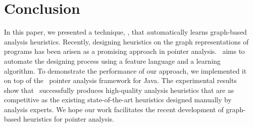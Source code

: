 
\section{Conclusion}
In this paper, we presented a technique, \OurCtx, that automatically learns graph-based analysis heuristics. 
Recently, designing heuristics on the graph representations of programs has been arisen as a promising approach in pointer analysis.
\OurCtx~aims to automate the designing process using a feature language and a learning algorithm. 
To demonstrate the performance of our approach, we implemented it on top of the \Doop~pointer analysis framework for Java.
The experimental results show that \OurCtx~successfully produces high-quality analysis heuristics that are as competitive as the existing state-of-the-art heuristics designed manually by analysis experts.
We hope our work facilitates the recent development of graph-based heuristics for pointer analysis. 




